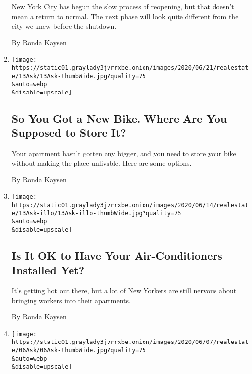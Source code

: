 \begin{enumerate}
  New York City has begun the slow process of reopening, but that
  doesn't mean a return to normal. The next phase will look quite
  different from the city we knew before the shutdown.

  By Ronda Kaysen
\item
  \href{/2020/06/20/realestate/bike-bicycle-rack-apartment-storage-coronavirus.html}{}

  \texttt{[image: https://static01.graylady3jvrrxbe.onion/images/2020/06/21/realestate/13Ask/13Ask-thumbWide.jpg?quality=75\\\&auto=webp\\\&disable=upscale]}

  \hypertarget{so-you-got-a-new-bike-where-are-you-supposed-to-store-it}{%
  \subsection{So You Got a New Bike. Where Are You Supposed to Store
  It?}\label{so-you-got-a-new-bike-where-are-you-supposed-to-store-it}}

  Your apartment hasn't gotten any bigger, and you need to store your
  bike without making the place unlivable. Here are some options.

  By Ronda Kaysen
\item
  \href{/2020/06/13/realestate/is-it-safe-to-have-your-air-conditioners-installed-yet-coronavirus.html}{}

  \texttt{[image: https://static01.graylady3jvrrxbe.onion/images/2020/06/14/realestate/13Ask-illo/13Ask-illo-thumbWide.jpg?quality=75\\\&auto=webp\\\&disable=upscale]}

  \hypertarget{is-it-ok-to-have-your-air-conditioners-installed-yet}{%
  \subsection{Is It OK to Have Your Air-Conditioners Installed
  Yet?}\label{is-it-ok-to-have-your-air-conditioners-installed-yet}}

  It's getting hot out there, but a lot of New Yorkers are still nervous
  about bringing workers into their apartments.

  By Ronda Kaysen
\item
  \href{/2020/06/06/realestate/can-my-dog-poop-on-someones-lawn-if-theres-no-sidewalk.html}{}

  \texttt{[image: https://static01.graylady3jvrrxbe.onion/images/2020/06/07/realestate/06Ask/06Ask-thumbWide.jpg?quality=75\\\&auto=webp\\\&disable=upscale]}

  \hypertarget{can-my-dog-poop-on-someones-lawn-if-theres-no-sidewalk}{%
}
\end{enumerate}
